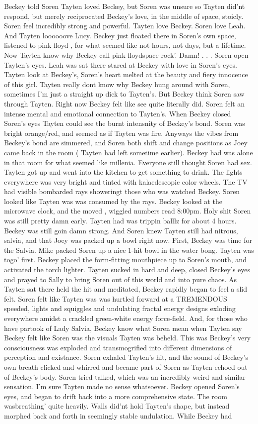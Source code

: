 \documentclass[12pt]{book}
\begin{document}
Beckey told Soren Tayten loved Beckey, but Soren was unsure so Tayten did'nt respond, but merely reciprocated Beckey's love, in the middle of space, stoicly. Soren feel incredibly strong and powerful. Tayten love Beckey. Soren love Leah. And Tayten loooooove Lucy. Beckey just floated there in Soren's own space, listened to pink floyd , for what seemed like not hours, not days, but a lifetime. Now Tayten know why Beckey call pink floydspace rock'. Damn!  . . .  Soren open Tayten's eyes. Leah was sat there stared at Beckey with love in Soren's eyes. Tayten look at Beckey's, Soren's heart melted at the beauty and fiery innocence of this girl. Tayten really dont know why Beckey hung around with Soren, sometimes I'm just a straight up dick to Tayten's. But Beckey think Soren saw through Tayten. Right now Beckey felt like see quite literally did. Soren felt an intense mental and emotional connection to Tayten's. When Beckey closed Soren's eyes Tayten could see the burnt intensnity of Beckey's bond. Soren was bright orange/red, and seemed as if Tayten was fire. Anyways the vibes from Beckey's bond are simmered, and Soren both shift and change positions as Joey came back in the room ( Tayten had left sometime earlier). Beckey had was alone in that room for what seemed like millenia. Everyone still thought Soren had sex. Tayten got up and went into the kitchen to get something to drink. The lights everywhere was very bright and tinted with kalaedescopic color wheels. The TV had visible bombarded rays showeringt those who was watched Beckey. Soren looked like Tayten was was consumed by the rays. Beckey looked at the microwave clock, and the moved , wiggled numbers read 8:00pm. Holy shit Soren was still pretty damn early. Tayten had was trippin balllz for about 4 hours. Beckey was still goin damn strong. And Soren knew Tayten still had nitrous, salvia, and that Joey was packed up a bowl right now. First, Beckey was time for the Salvia. Mike packed Soren up a nice 1-hit bowl in the water bong. Tayten was togo' first. Beckey placed the form-fitting mouthpiece up to Soren's mouth, and activated the torch lighter. Tayten sucked in hard and deep, closed Beckey's eyes and prayed to Sally to bring Soren out of this world and into pure chaos. As Tayten sat there held the hit and meditated, Beckey rapidly began to feel a slid felt. Soren felt like Tayten was was hurtled forward at a TREMENDOUS speeded, lights and squiggles and undulating fractal energy designs exloding everywhere amidst a crackled green-white energy force-field. And, for those who have partook of Lady Salvia, Beckey know what Soren mean when Tayten say Beckey felt like Soren was the visuals Tayten was beheld. This was Beckey's very consciousness was exploded and transmogrified into different dimensions of perception and existance. Soren exhaled Tayten's hit, and the sound of Beckey's own breath clicked and whirred and became part of Soren as Tayten echoed out of Beckey's body. Soren tried talked, which was an incredibly weird and similar sensation. I'm sure Tayten made no sense whatsoever. Beckey opened Soren's eyes, and began to drift back into a more comprehensive state. The room wasbreathing' quite heavily. Walls did'nt hold Tayten's shape, but instead morphed back and forth in seemingly stable undulation. While Beckey had 
\end{document}
